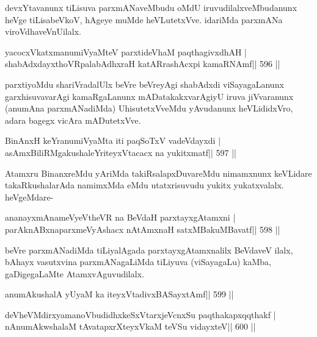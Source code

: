 \begin{artha}
devxYtavanunx tiLisuva parxmANaveMbudu oMdU iruvudilalxveMbudanunx heVge tiLisabeVkoV, hAgeye muMde heVLutetxVve. idariMda parxmANa viroVdhaveVnUilalx.
\end{artha}

\begin{shl}
yacocxVkatxmanumiVyaMteV parxtideVhaM paqthagivxdhAH |
shabAdxdayxthoVRpalabAdhxraH katARrashAcxpi kamaRNAmf\hfill || 596 ||
\end{shl}

\begin{artha}
parxtiyoMdu shariVradalUlx beVre beVreyAgi shabAdxdi viSayagaLanunx
garxhisuvavarAgi kamaRgaLanunx mADatakakxvarAgiyU iruva jiVvaranunx
(anumAna parxmANadiMda) UhisutetxVveMdu yAvudanunx heVLididxVro, adara
bagegx vicAra mADutetxVve.
\end{artha}

\begin{shl}
BinAnxH keYranumiVyaMta iti paqSoTxV vadeVdayxdi |
asAmxBiliRMgakushaleYriteyxVtacacx na yukitxmatf\hfill || 597 ||
\end{shl}

\begin{artha}
Atamxru BinanxreMdu yAriMda takiRsalapxDuvareMdu nimamxnunx keVLidare
takaRkushalarAda namimxMda eMdu utatxrisuvudu yukitx yukatxvalalx.
heVgeMdare-
\end{artha}

\begin{shl}
ananayxmAnameVyeV\s theVR na BeVdaH parxtayxgAtamxni |
parAknABxnaparxmeVyAshacx nA\s\s tAmxnaH satxMBakuMBavatf\hfill || 598 ||
\end{shl}

\begin{artha}
beVre parxmANadiMda tiLiyalAgada parxtayxgAtamxnalilx BeVdaveV ilalx, bAhayx vasutxvina parxmANagaLiMda tiLiyuva (viSayagaLu) kaMba, gaDigegaLaMte AtamxvAguvudilalx.
\end{artha}



\begin{shl}
anumAkushalA yUyaM ka iteyxVtadivxBASayxtAmf\hfill || 599 ||
\end{shl}

\begin{shl}
deVheVMdirxyamanoVbudidhxkeSxVtarxjeVcnxSu paqthakapxqqthakf |
nAnumAkwshalaM tAvatapxrXteyxVkaM teVSu vidayxteV\hfill || 600 ||
\end{shl}

